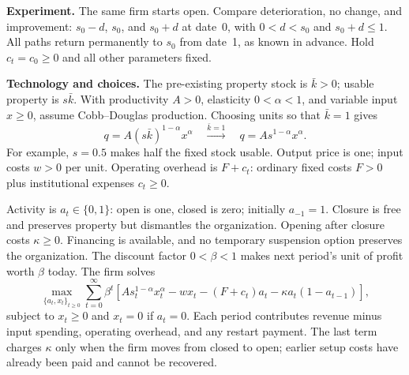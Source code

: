 \documentclass[11pt,letterpaper]{article}
\begin{document}
\textbf{Experiment.} The same firm starts open. Compare deterioration, no change,
and improvement: $s_0-d$, $s_0$, and $s_0+d$ at date~0, with $0<d<s_0$ and
$s_0+d\leq1$. All paths return permanently to $s_0$ from date~1, as known in
advance. Hold $c_t=c_0\geq0$ and all other parameters fixed.

\newpage
\textbf{Technology and choices.} The pre-existing property stock is $\bar k>0$;
usable property is $s\bar k$. With productivity $A>0$, elasticity $0<\alpha<1$,
and variable input $x\geq0$, assume Cobb--Douglas production. Choosing units
so that $\bar k=1$ gives
\begin{equation}\label{eq:technology}
q=A(s\bar k)^{1-\alpha}x^\alpha
\quad\xrightarrow{\bar k=1}\quad q=As^{1-\alpha}x^\alpha.
\end{equation}
For example, $s=0.5$ makes half the fixed stock usable. Output price is one;
input costs $w>0$ per unit. Operating overhead is $F+c_t$: ordinary fixed costs
$F>0$ plus institutional expenses $c_t\geq0$.

Activity is $a_t\in\{0,1\}$: open is one, closed is zero; initially $a_{-1}=1$.
Closure is free and preserves property but dismantles the organization. Opening
after closure costs $\kappa\geq0$. Financing is available, and no temporary
suspension option preserves the organization. The discount factor $0<\beta<1$
makes next period's unit of profit worth $\beta$ today. The firm solves
\begin{equation}\label{eq:problem}
\max_{\{a_t,x_t\}_{t\geq0}}\sum_{t=0}^{\infty}\beta^t
\left[As_t^{1-\alpha}x_t^\alpha-wx_t-(F+c_t)a_t
-\kappa a_t(1-a_{t-1})\right],
\end{equation}
subject to $x_t\geq0$ and $x_t=0$ if $a_t=0$. Each period contributes revenue
minus input spending, operating overhead, and any restart payment. The last
term charges $\kappa$ only when the firm moves from closed to open; earlier
setup costs have already been paid and cannot be recovered.
\end{document}
